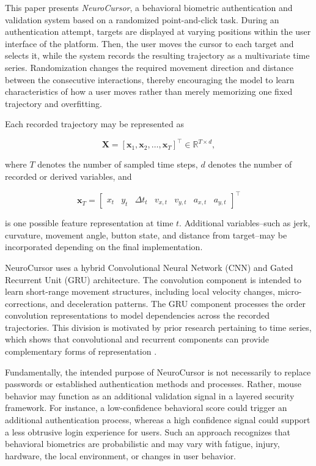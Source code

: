 \documentclass[conference]{IEEEtran}
\begin{document}
This paper presents \textit{NeuroCursor}, a behavioral biometric authentication and validation system based on a randomized point-and-click task. During an authentication attempt, targets are displayed at varying positions within the user interface of the platform. Then, the user moves the cursor to each target and selects it, while the system records the resulting trajectory as a multivariate time series. Randomization changes the required movement direction and distance between the consecutive interactions, thereby encouraging the model to learn characteristics of how a user moves rather than merely memorizing one fixed trajectory and overfitting. 

Each recorded trajectory may be represented as 

\begin{equation}
\mathbf{X}
=
\left[
\mathbf{x}_1,
\mathbf{x}_2,
\ldots,
\mathbf{x}_T
\right]^{\top}
\in
\mathbb{R}^{T \times d},
\label{eq:trajectory matrix}
\end{equation}

where $T$ denotes the number of sampled time steps, $d$ denotes the number of recorded or derived variables, and 

\begin{equation}
\mathbf{x}_T = 
\begin{bmatrix}
x_t &
y_t &
\Delta t_t & 
v_{x,t} & 
v_{y,t} & 
a_{x,t} & 
a_{y,t}
\end{bmatrix}^{\top}
\label{eq:trajectory_vector}
\end{equation}

is one possible feature representation at time $t$. Additional variables--such as jerk, curvature, movement angle, button state, and distance from target--may be incorporated depending on the final implementation. 

NeuroCursor uses a hybrid Convolutional Neural Network (CNN) and Gated Recurrent Unit (GRU) architecture. The convolution component is intended to learn short-range movement structures, including local velocity changes, micro-corrections, and deceleration patterns. The GRU component processes the order convolution representations to model dependencies across the recorded trajectories. This division is motivated by prior research pertaining to time series, which shows that convolutional and recurrent components can provide complementary forms of representation \cite{foumaniTimeSeriesSurvey, elsayedGRUFCN}.

Fundamentally, the intended purpose of NeuroCursor is not necessarily to replace passwords or established authentication methods and processes. Rather, mouse behavior may function as an additional validation signal in a layered security framework. For instance, a low-confidence behavioral score could trigger an additional authentication process, whereas a high confidence signal could support a less obtrusive login experience for users. Such an approach recognizes that behavioral biometrics are probabilistic and may vary with fatigue, injury, hardware, the local environment, or changes in user behavior.   
\end{document}
